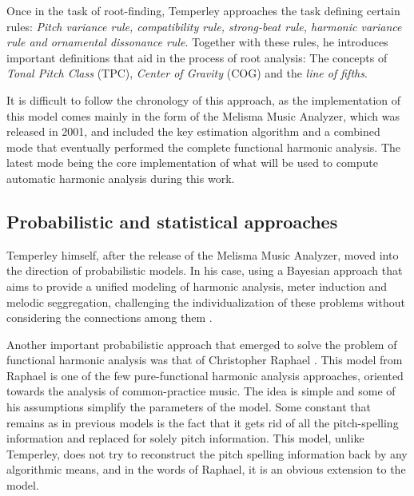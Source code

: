     Once in the task of root-finding, Temperley approaches the task defining certain rules: \emph{Pitch variance rule, compatibility rule, strong-beat rule, harmonic variance rule and ornamental dissonance rule}. Together with these rules, he introduces important definitions that aid in the process of root analysis: The concepts of \emph{Tonal Pitch Class} (TPC), \emph{Center of Gravity} (COG) and the \emph{line of fifths}.

    It is difficult to follow the chronology of this approach, as the implementation of this model comes mainly in the form of the Melisma Music Analyzer, which was released in 2001, and included the key estimation algorithm and a combined mode that eventually performed the complete functional harmonic analysis. The latest mode being the core implementation of what will be used to compute automatic harmonic analysis during this work.

    \subsection{Probabilistic and statistical approaches}
    Temperley himself, after the release of the Melisma Music Analyzer, moved into the direction of probabilistic models. In his case, using a Bayesian approach that aims to provide a unified modeling of harmonic analysis, meter induction and melodic seggregation, challenging the individualization of these problems without considering the connections among them \cite{temperley2009unified}.

    Another important probabilistic approach that emerged to solve the problem of functional harmonic analysis was that of Christopher Raphael \cite{raphael2003harmonic}.
    This model from Raphael is one of the few pure-functional harmonic analysis approaches, oriented towards the analysis of common-practice music. The idea is simple and some of his assumptions simplify the parameters of the model. Some constant that remains as in previous models is the fact that it gets rid of all the pitch-spelling information and replaced for solely pitch information. This model, unlike Temperley, does not try to reconstruct the pitch spelling information back by any algorithmic means, and in the words of Raphael, it is an obvious extension to the model.

